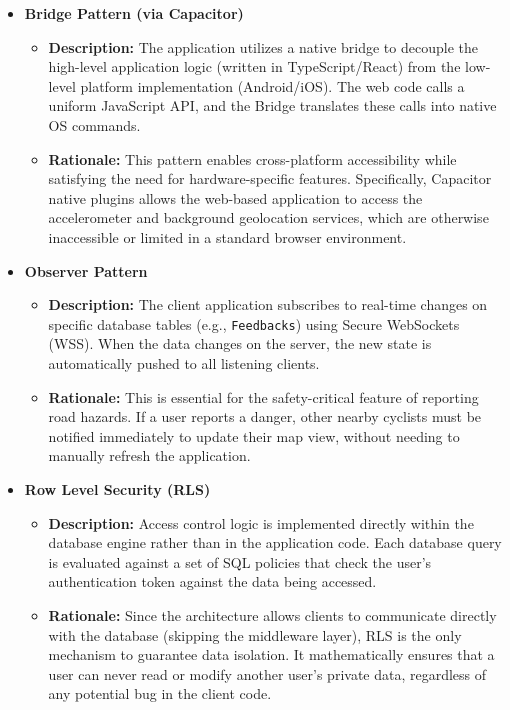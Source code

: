 \begin{itemize}
    \item \textbf{Bridge Pattern (via Capacitor)}
    \begin{itemize}
        \item \textbf{Description:} The application utilizes a native bridge to decouple the high-level application logic (written in TypeScript/React) from the low-level platform implementation (Android/iOS). The web code calls a uniform JavaScript API, and the Bridge translates these calls into native OS commands.
        \item \textbf{Rationale:} This pattern enables cross-platform accessibility while satisfying the need for hardware-specific features. Specifically, Capacitor native plugins allows the web-based application to access the accelerometer and background geolocation services, which are otherwise inaccessible or limited in a standard browser environment.
    \end{itemize}

    \item \textbf{Observer Pattern}
    \begin{itemize}
        \item \textbf{Description:} The client application subscribes to real-time changes on specific database tables (e.g., \texttt{Feedbacks}) using Secure WebSockets (WSS). When the data changes on the server, the new state is automatically pushed to all listening clients.
        \item \textbf{Rationale:} This is essential for the safety-critical feature of reporting road hazards. If a user reports a danger, other nearby cyclists must be notified immediately to update their map view, without needing to manually refresh the application.
    \end{itemize}

    \item \textbf{Row Level Security (RLS)}
    \begin{itemize}
        \item \textbf{Description:} Access control logic is implemented directly within the database engine rather than in the application code. Each database query is evaluated against a set of SQL policies that check the user's authentication token against the data being accessed.
        \item \textbf{Rationale:} Since the architecture allows clients to communicate directly with the database (skipping the middleware layer), RLS is the only mechanism to guarantee data isolation. It mathematically ensures that a user can never read or modify another user's private data, regardless of any potential bug in the client code.
    \end{itemize}
\end{itemize}